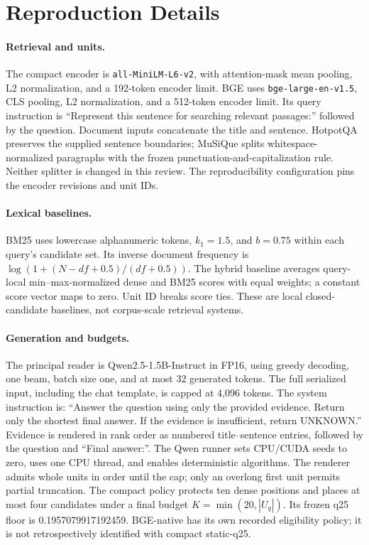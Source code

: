 \section{Reproduction Details}
\label{app:reproduction}
\paragraph{Retrieval and units.}
The compact encoder is \texttt{all-MiniLM-L6-v2}, with attention-mask mean
pooling, L2 normalization, and a 192-token encoder limit. BGE uses
\texttt{bge-large-en-v1.5}, CLS pooling, L2 normalization, and a 512-token
encoder limit. Its query instruction is ``Represent this sentence for
searching relevant passages:'' followed by the question. Document inputs
concatenate the title and sentence. HotpotQA preserves the supplied sentence
boundaries; MuSiQue splits whitespace-normalized paragraphs with the frozen
punctuation-and-capitalization rule. Neither splitter is changed in this review.
The reproducibility configuration pins the encoder revisions and unit IDs.

\paragraph{Lexical baselines.}
BM25 uses lowercase alphanumeric tokens, $k_1=1.5$, and $b=0.75$ within each
query's candidate set. Its inverse document frequency is
$\log(1+(N-df+0.5)/(df+0.5))$. The hybrid baseline averages query-local
min--max-normalized dense and BM25 scores with equal weights; a constant
score vector maps to zero. Unit ID breaks score ties. These are local
closed-candidate baselines, not corpus-scale retrieval systems.

\paragraph{Generation and budgets.}
The principal reader is Qwen2.5-1.5B-Instruct in FP16, using greedy decoding,
one beam, batch size one, and at most 32 generated tokens. The full serialized
input, including the chat template, is capped at 4,096 tokens. The system
instruction is: ``Answer the question using only the provided evidence.
Return only the shortest final answer. If the evidence is insufficient,
return UNKNOWN.'' Evidence is rendered in rank order as numbered
title--sentence entries, followed by the question and ``Final answer:''.
The Qwen runner sets CPU/CUDA seeds to zero, uses one CPU thread, and
enables deterministic algorithms. The renderer admits whole units in order
until the cap; only an overlong first unit permits partial truncation.
The compact policy protects ten dense positions and places at most four
candidates under a final budget $K=\min(20,|U_q|)$. Its frozen q25 floor is
0.1957079917192459. BGE-native has its own recorded eligibility policy;
it is not retrospectively identified with compact static-q25.

